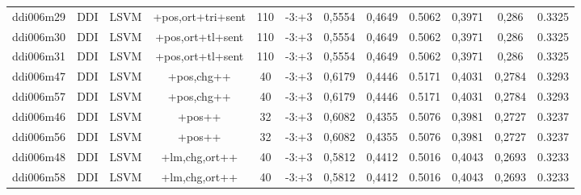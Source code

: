 \documentclass[a4paper]{article}
\begin{document}
\begin{landscape}
\begin{center}
\begin{tabular}{ |c|c|c|c|c|c|c|c|c|c|c|c|}
 	
 
 	
 		
 		\small{ ddi006m29 } & DDI & LSVM & +pos,ort+tri+sent  &  110 &  -3:+3  &  0,5554 & 0,4649 & 0.5062  &  0,3971 & 0,286 & 0.3325 \\
 		

 	
 
 	
 		
 		\small{ ddi006m30 } & DDI & LSVM & +pos,ort+tl+sent  &  110 &  -3:+3  &  0,5554 & 0,4649 & 0.5062  &  0,3971 & 0,286 & 0.3325 \\
 		

 	
 
 	
 		
 		\small{ ddi006m31 } & DDI & LSVM & +pos,ort+tl+sent  &  110 &  -3:+3  &  0,5554 & 0,4649 & 0.5062  &  0,3971 & 0,286 & 0.3325 \\
 		

 	
 
 	
 		
 		\small{ ddi006m47 } & DDI & LSVM & +pos,chg++  &  40 &  -3:+3  &  0,6179 & 0,4446 & 0.5171  &  0,4031 & 0,2784 & 0.3293 \\
 		

 	
 
 	
 		
 		\small{ ddi006m57 } & DDI & LSVM & +pos,chg++  &  40 &  -3:+3  &  0,6179 & 0,4446 & 0.5171  &  0,4031 & 0,2784 & 0.3293 \\
 		

 	
 
 	
 		
 		\small{ ddi006m46 } & DDI & LSVM & +pos++  &  32 &  -3:+3  &  0,6082 & 0,4355 & 0.5076  &  0,3981 & 0,2727 & 0.3237 \\
 		

 	
 
 	
 		
 		\small{ ddi006m56 } & DDI & LSVM & +pos++  &  32 &  -3:+3  &  0,6082 & 0,4355 & 0.5076  &  0,3981 & 0,2727 & 0.3237 \\
 		

 	
 
 	
 		
 		\small{ ddi006m48 } & DDI & LSVM & +lm,chg,ort++  &  40 &  -3:+3  &  0,5812 & 0,4412 & 0.5016  &  0,4043 & 0,2693 & 0.3233 \\
 		

 	
 
 	
 		
 		\small{ ddi006m58 } & DDI & LSVM & +lm,chg,ort++  &  40 &  -3:+3  &  0,5812 & 0,4412 & 0.5016  &  0,4043 & 0,2693 & 0.3233 \\
 		


\end{tabular}
\end{center}
\end{landscape}
\end{document}
